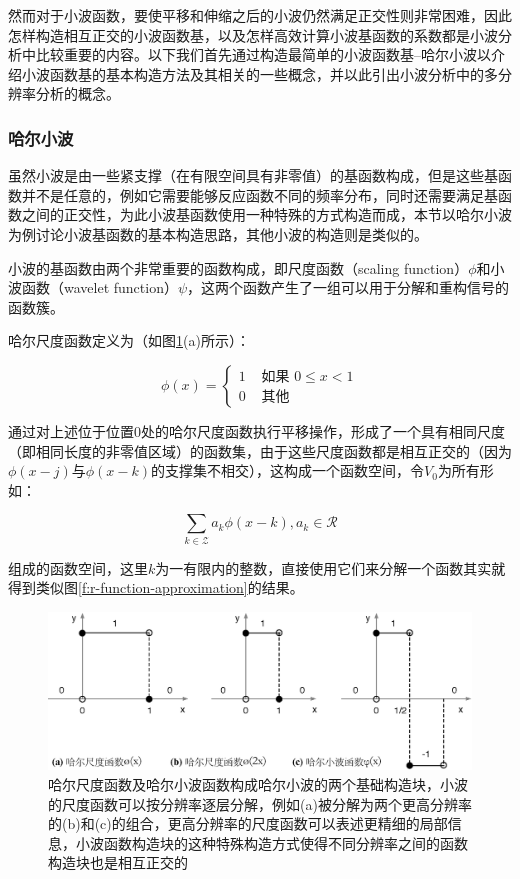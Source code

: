 然而对于小波函数，要使平移和伸缩之后的小波仍然满足正交性则非常困难，因此怎样构造相互正交的小波函数基，以及怎样高效计算小波基函数的系数都是小波分析中比较重要的内容。以下我们首先通过构造最简单的小波函数基--哈尔小波以介绍小波函数基的基本构造方法及其相关的一些概念，并以此引出小波分析中的多分辨率分析的概念。




\subsubsection{哈尔小波}\label{sec:r-haar-wavelet}
虽然小波是由一些紧支撑（在有限空间具有非零值）的基函数构成，但是这些基函数并不是任意的，例如它需要能够反应函数不同的频率分布，同时还需要满足基函数之间的正交性，为此小波基函数使用一种特殊的方式构造而成，本节以哈尔小波为例讨论小波基函数的基本构造思路，其他小波的构造则是类似的。

小波的基函数由两个非常重要的函数构成，即尺度函数（scaling function）$\phi$和小波函数（wavelet function）$\psi$，这两个函数产生了一组可以用于分解和重构信号的函数簇。

哈尔尺度函数定义为（如图\ref{f:r-haar-functions}(a)所示）：

\begin{equation}
	\phi(x)=\begin{cases}
		1 & \text{ 如果 } 0\leq x<1\\
		0 & \text{ 其他 }
	\end{cases}
\end{equation}

\noindent 通过对上述位于位置0处的哈尔尺度函数执行平移操作，形成了一个具有相同尺度（即相同长度的非零值区域）的函数集，由于这些尺度函数都是相互正交的（因为$\phi(x-j)$与$\phi(x-k)$的支撑集不相交），这构成一个函数空间，令$V_0$为所有形如：

\begin{equation}
	\sum_{k\in \mathcal{Z}}a_k\phi(x-k),a_k\in \mathcal{R}
\end{equation}

\noindent 组成的函数空间，这里$k$为一有限内的整数，直接使用它们来分解一个函数其实就得到类似图\ref{f:r-function-approximation}的结果。

\begin{figure}
	\includegraphics[width=1.0\textwidth]{figures/r/haar-functions}
	\caption{哈尔尺度函数及哈尔小波函数构成哈尔小波的两个基础构造块，小波的尺度函数可以按分辨率逐层分解，例如(a)被分解为两个更高分辨率的(b)和(c)的组合，更高分辨率的尺度函数可以表述更精细的局部信息，小波函数构造块的这种特殊构造方式使得不同分辨率之间的函数构造块也是相互正交的}
	\label{f:r-haar-functions}
\end{figure}

